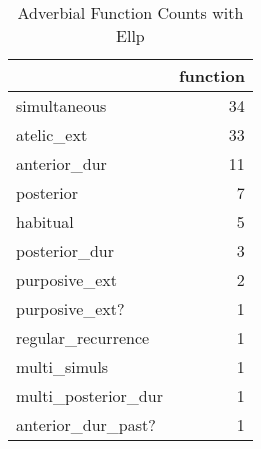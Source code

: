 \begin{table}[htbp!]
\centering
\caption{Adverbial Function Counts with Ellp}
\label{table:Ellp_funct_ct}
\begin{tabular}{lr}
\toprule
{} &  function \\
\midrule
simultaneous        &        34 \\
atelic\_ext          &        33 \\
anterior\_dur        &        11 \\
posterior           &         7 \\
habitual            &         5 \\
posterior\_dur       &         3 \\
purposive\_ext       &         2 \\
purposive\_ext?      &         1 \\
regular\_recurrence  &         1 \\
multi\_simuls        &         1 \\
multi\_posterior\_dur &         1 \\
anterior\_dur\_past?  &         1 \\
\bottomrule
\end{tabular}
\end{table}
